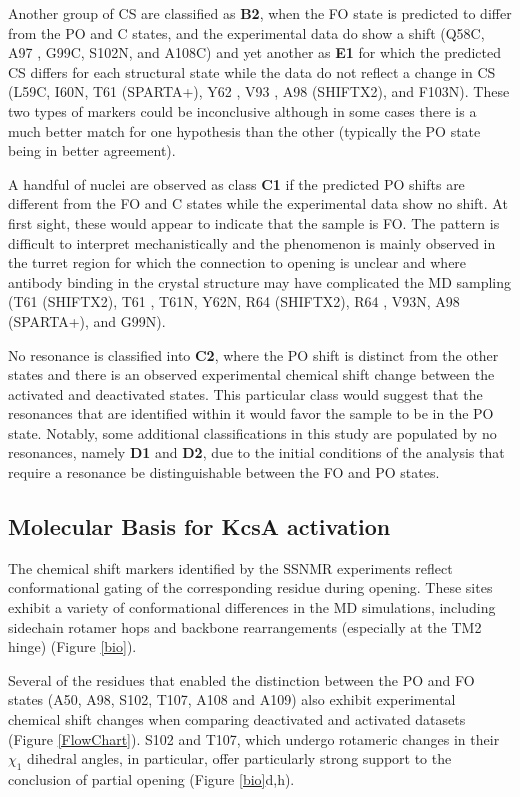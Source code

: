 \documentclass[%
 aip,
 amsmath,amssymb,
 preprint,%
]{revtex4-1}
\newcommand{\ca}{\ce{C_\alpha} }
\newcommand{\cb}{\ce{C_\beta} }
\begin{document}
Another group of CS are classified as \textbf{B2}, when the FO state is predicted to differ from the PO and C states, and the experimental data do show a shift (Q58C, A97\cb, G99C, S102N, and A108C) and yet another as \textbf{E1} for which the predicted CS differs for each structural state while the data do not reflect a change in CS (L59C, I60N, T61\ca (SPARTA+), Y62\cb, V93\ca, A98\ca (SHIFTX2), and F103N). These two types of markers could be inconclusive although in some cases there is a much better match for one hypothesis than the other (typically the PO state being in better agreement). 
 
A handful of nuclei are observed as class \textbf{C1} if the predicted PO shifts are different from the FO and C states while the experimental data show no shift. At first sight, these would appear to indicate that the sample is FO. The pattern is difficult to interpret mechanistically and the phenomenon is mainly observed in the turret region for which the connection to opening is unclear and where antibody binding in the crystal structure may have complicated the MD sampling (T61\ca (SHIFTX2), T61\cb, T61N, Y62N, R64\ca (SHIFTX2), R64\cb, V93N, A98\ca (SPARTA+), and G99N).

No resonance is classified into \textbf{C2}, where the PO shift is distinct from the other states and there is an observed experimental chemical shift change between the activated and deactivated states. This particular class would suggest that the resonances that are identified within it would favor the sample to be in the PO state. Notably, some additional classifications in this study are populated by no resonances, namely \textbf{D1} and \textbf{D2}, due to the initial conditions of the analysis that require a resonance be distinguishable between the FO and PO states.


\subsection{Molecular Basis for KcsA activation}

The chemical shift markers identified by the SSNMR experiments reflect conformational gating of the corresponding residue during opening. These sites exhibit a variety of conformational differences in the MD simulations, including sidechain rotamer hops and backbone rearrangements (especially at the TM2 hinge) (Figure \ref{bio}).

Several of the residues that enabled the distinction between the PO and FO states (A50, A98, S102, T107, A108 and A109) also exhibit experimental chemical shift changes when comparing deactivated and activated datasets (Figure \ref{FlowChart}). S102 and T107, which undergo rotameric changes in their $\chi_1$ dihedral angles, in particular, offer particularly strong support to the conclusion of partial opening (Figure \ref{bio}d,h). 
\end{document}
